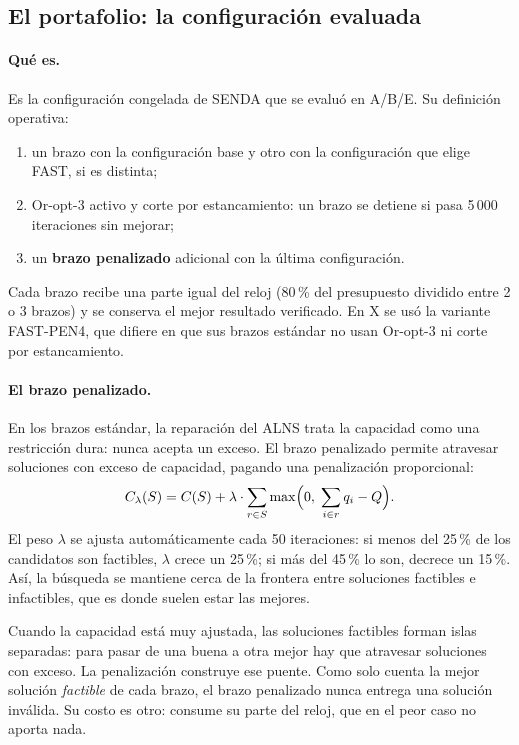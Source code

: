\documentclass[11pt,a4paper]{article}
\begin{document}
\subsection{El portafolio: la configuración evaluada}
\label{sec:portafolio}

\paragraph{Qué es.} Es la configuración congelada de SENDA que se evaluó en A/B/E. Su
definición operativa:
\begin{enumerate}[leftmargin=1.5em]
\item un brazo con la configuración base y otro con la configuración que elige FAST, si es
distinta;
\item Or-opt-3 activo y corte por estancamiento: un brazo se detiene si pasa 5\,000 iteraciones sin
mejorar;
\item un \textbf{brazo penalizado} adicional con la última configuración.
\end{enumerate}
Cada brazo recibe una parte igual del reloj (80\,\% del presupuesto dividido entre 2 o 3 brazos) y
se conserva el mejor resultado verificado. En X se usó la variante FAST-PEN4, que difiere en que sus
brazos estándar no usan Or-opt-3 ni corte por estancamiento.

\paragraph{El brazo penalizado.} En los brazos estándar, la reparación del ALNS trata la capacidad
como una restricción dura: nunca acepta un exceso. El brazo penalizado permite atravesar soluciones
con exceso de capacidad, pagando una penalización proporcional:
\begin{equation}
C_\lambda(S)=C(S)+\lambda\cdot\sum_{r\in S}\max\Bigl(0,\;\sum_{i\in r}q_i-Q\Bigr).
\end{equation}
El peso $\lambda$ se ajusta automáticamente cada 50 iteraciones: si menos del 25\,\% de los candidatos son
factibles, $\lambda$ crece un 25\,\%; si más del 45\,\% lo son, decrece un 15\,\%. Así, la búsqueda se
mantiene cerca de la frontera entre soluciones factibles e infactibles, que es donde suelen estar las
mejores.

\begin{ideaclave}
Cuando la capacidad está muy ajustada, las soluciones factibles forman islas separadas: para pasar de
una buena a otra mejor hay que atravesar soluciones con exceso. La penalización construye ese puente.
Como solo cuenta la mejor solución \emph{factible} de cada brazo, el brazo penalizado nunca entrega
una solución inválida. Su costo es otro: consume su parte del reloj, que en el peor caso no aporta
nada.
\end{ideaclave}
\end{document}
